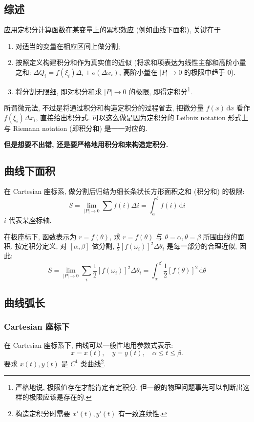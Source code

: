 \documentclass{book}
\newcommand{\dd}{\,\mathrm{d}}
\newcommand{\abs}[1]{\left\lvert #1 \right\rvert}
\renewcommand{\le}{\leqslant}
\numberwithin{equation}{section}
\numberwithin{figure}{section}
\theoremstyle{definition}
\begin{document}
\subsection{综述}
应用定积分计算函数在某变量上的累积效应 (例如曲线下面积), 关键在于
\begin{enumerate}
  \item 对适当的变量在相应区间上做分割;
  \item 按照定义构建积分和作为真实值的近似 (将求和项表达为线性主部和高阶小量之和: $\Delta Q_i=f(\xi_i)\Delta_i+o(\Delta x_i)$, 高阶小量在 $\abs{P}\to0$ 的极限中趋于 $0$).
  \item 将分割无限细, 即对积分和求 $\abs{P}\to0$ 的极限, 即得定积分\footnote{严格地说, 极限值存在才能肯定有定积分, 但一般的物理问题事先可以判断出这样的极限应该是存在的.}.
\end{enumerate}

所谓微元法, 不过是将通过积分和构造定积分的过程省去, 把微分量 $f(x)\dd x$ 看作 $f(\xi_i)\Delta x_i$, 直接给出积分式. 可以这么做是因为定积分的 Leibniz notation 形式上与 Riemann notation (即积分和) 是一一对应的.

\textbf{但是想要不出错, 还是要严格地用积分和来构造定积分.}
\subsection{曲线下面积}
在 Cartesian 座标系, 做分割后归结为细长条状长方形面积之和 (积分和) 的极限:
\begin{equation*}
  S=\lim_{\abs{P}\to0}\sum f(i)\Delta i=\int_{a}^{b} f(i) \dd i
\end{equation*}
$i$ 代表某座标轴.

在极座标下, 函数表示为 $r=f(\theta)$, 求 $r=f(\theta)$ 与 $\theta=\alpha,\theta=\beta$ 所围曲线的面积. 按定积分定义, 对 $[\alpha,\beta]$ 做分割, $\frac{1}{2}[f(\omega_i)]^2\Delta \theta_i$ 是每一部分的合理近似, 因此:
\begin{equation*}
  S=\lim_{\abs{P}\to0}\sum_{i}^{}\frac{1}{2}[f(\omega_i)]^2\Delta\theta_i=\int_{\alpha}^{\beta} \frac{1}{2}[f(\theta)]^2 \dd \theta
\end{equation*}
%
\subsection{曲线弧长}
\subsubsection{Cartesian 座标下}
在 Cartesian 座标系下, 曲线可以一般性地用参数式表示:
\begin{equation*}
  x=x(t),\quad y=y(t),\quad \alpha\le t\le\beta.
\end{equation*}
要求 $x(t),y(t)$ 是 $C^1$ 类曲线\footnote{构造定积分时需要 $x'(t),y'(t)$ 有一致连续性.}.
\end{document}

